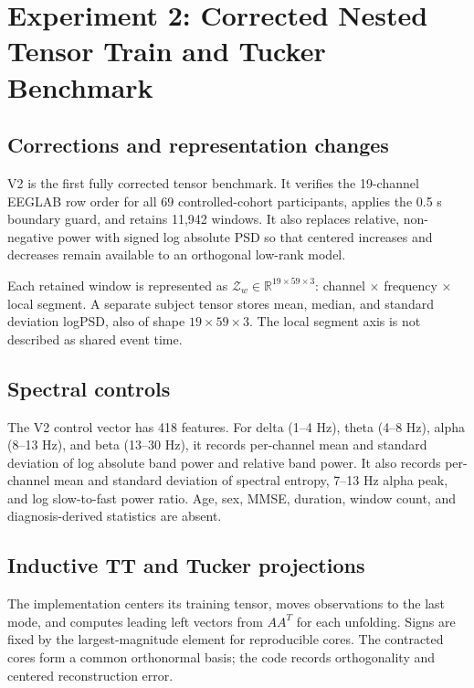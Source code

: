 \chapter{Experiment 2: Corrected Nested Tensor Train and Tucker Benchmark}
\label{ch:v2}

\section{Corrections and representation changes}

V2 is the first fully corrected tensor benchmark. It verifies the 19-channel
EEGLAB row order for all 69 controlled-cohort participants, applies the 0.5 s
boundary guard, and retains 11,942 windows. It also replaces relative,
non-negative power with signed log absolute PSD so that centered increases and
decreases remain available to an orthogonal low-rank model.

Each retained window is represented as
$\mathcal{Z}_w\in\mathbb{R}^{19\times59\times3}$: channel $\times$ frequency
$\times$ local segment. A separate subject tensor stores mean, median, and
standard deviation logPSD, also of shape $19\times59\times3$. The local segment
axis is not described as shared event time.

\section{Spectral controls}

The V2 control vector has 418 features. For delta (1--4 Hz), theta (4--8 Hz),
alpha (8--13 Hz), and beta (13--30 Hz), it records per-channel mean and standard
deviation of log absolute band power and relative band power. It also records
per-channel mean and standard deviation of spectral entropy, 7--13 Hz alpha
peak, and log slow-to-fast power ratio. Age, sex, MMSE, duration, window count,
and diagnosis-derived statistics are absent.

\section{Inductive TT and Tucker projections}

The  implementation centers its training tensor,
moves observations to the last mode, and computes leading left vectors from
$AA^T$ for each unfolding. Signs are fixed by the largest-magnitude element for
reproducible cores. The contracted cores form a common orthonormal basis; the
code records orthogonality and centered reconstruction error.

